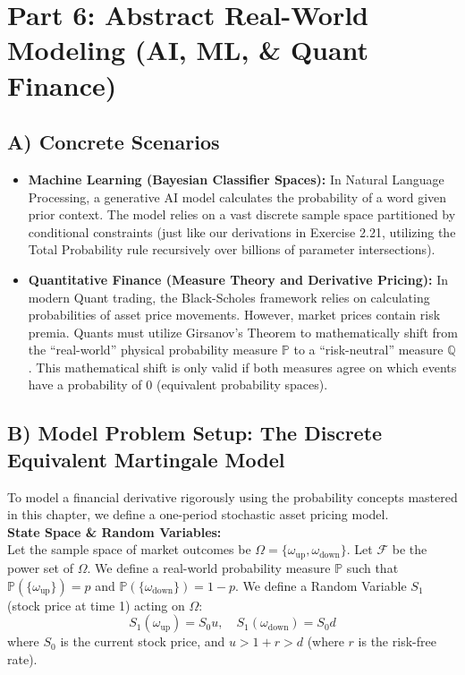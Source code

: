 \documentclass[12pt]{article}
\begin{document}
\section{Part 6: Abstract Real-World Modeling (AI, ML, \& Quant Finance)}

\subsection{A) Concrete Scenarios}
\begin{itemize}
    \item \textbf{Machine Learning (Bayesian Classifier Spaces):} In Natural Language Processing, a generative AI model calculates the probability of a word given prior context. The model relies on a vast discrete sample space partitioned by conditional constraints (just like our derivations in Exercise 2.21, utilizing the Total Probability rule recursively over billions of parameter intersections).
    \item \textbf{Quantitative Finance (Measure Theory and Derivative Pricing):} In modern Quant trading, the Black-Scholes framework relies on calculating probabilities of asset price movements. However, market prices contain risk premia. Quants must utilize Girsanov's Theorem to mathematically shift from the ``real-world'' physical probability measure $\mathbb{P}$ to a ``risk-neutral'' measure $\mathbb{Q}$. This mathematical shift is only valid if both measures agree on which events have a probability of $0$ (equivalent probability spaces).
\end{itemize}

\subsection{B) Model Problem Setup: The Discrete Equivalent Martingale Model}
To model a financial derivative rigorously using the probability concepts mastered in this chapter, we define a one-period stochastic asset pricing model. 
\vspace{0.2cm}\\
\noindent \textbf{State Space & Random Variables:} \\
Let the sample space of market outcomes be $\Omega = \{ \omega_{\text{up}}, \omega_{\text{down}} \}$. Let $\mathcal{F}$ be the power set of $\Omega$. We define a real-world probability measure $\mathbb{P}$ such that $\mathbb{P}(\{\omega_{\text{up}}\}) = p$ and $\mathbb{P}(\{\omega_{\text{down}}\}) = 1-p$. 
We define a Random Variable $S_1$ (stock price at time 1) acting on $\Omega$:
\[ S_1(\omega_{\text{up}}) = S_0 u, \quad S_1(\omega_{\text{down}}) = S_0 d \]
where $S_0$ is the current stock price, and $u > 1 + r > d$ (where $r$ is the risk-free rate).
\end{document}

